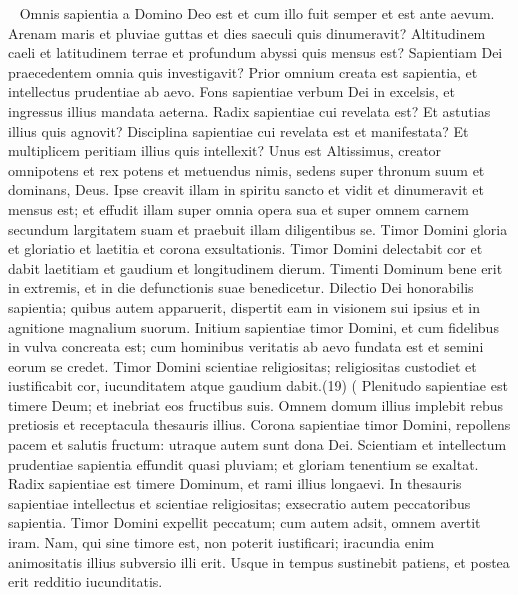 
\begin{biblechapter}   
\verse Omnis sapientia a Domino Deo est et cum illo fuit semper et est ante aevum. 
\verse Arenam maris et pluviae guttas et dies saeculi quis dinumeravit? Altitudinem caeli et latitudinem terrae et profundum abyssi quis mensus est? 
\verse Sapientiam Dei praecedentem omnia quis investigavit? 
\verse Prior omnium creata est sapientia, et intellectus prudentiae ab aevo. 
\verse Fons sapientiae verbum Dei in excelsis, et ingressus illius mandata aeterna. 
\verse Radix sapientiae cui revelata est? Et astutias illius quis agnovit? 
\verse Disciplina sapientiae cui revelata est et manifestata? Et multiplicem peritiam illius quis intellexit? 
\verse Unus est Altissimus, creator omnipotens et rex potens et metuendus nimis, sedens super thronum suum et dominans, Deus. 
\verse Ipse creavit illam in spiritu sancto et vidit et dinumeravit et mensus est; 
\verse et effudit illam super omnia opera sua et super omnem carnem secundum largitatem suam et praebuit illam diligentibus se. 
\verse Timor Domini gloria et gloriatio et laetitia et corona exsultationis. 
\verse Timor Domini delectabit cor et dabit laetitiam et gaudium et longitudinem dierum. 
\verse Timenti Dominum bene erit in extremis, et in die defunctionis suae benedicetur. 
\verse Dilectio Dei honorabilis sapientia; 
\verse quibus autem apparuerit, dispertit eam in visionem sui ipsius et in agnitione magnalium suorum. 
\verse Initium sapientiae timor Domini, et cum fidelibus in vulva concreata est; cum hominibus veritatis ab aevo fundata est et semini eorum se credet. 
\verse Timor Domini scientiae religiositas; 
\verse religiositas custodiet et iustificabit cor, iucunditatem atque gaudium dabit.(19) (
\verse Plenitudo sapientiae est timere Deum; et inebriat eos fructibus suis. 
\verse Omnem domum illius implebit rebus pretiosis et receptacula thesauris illius. 
\verse Corona sapientiae timor Domini, repollens pacem et salutis fructum: 
\verse utraque autem sunt dona Dei. 
\verse Scientiam et intellectum prudentiae sapientia effundit quasi pluviam; et gloriam tenentium se exaltat. 
\verse Radix sapientiae est timere Dominum, et rami illius longaevi. 
\verse In thesauris sapientiae intellectus et scientiae religiositas; exsecratio autem peccatoribus sapientia. 
\verse Timor Domini expellit peccatum; cum autem adsit, omnem avertit iram. 
\verse Nam, qui sine timore est, non poterit iustificari; iracundia enim animositatis illius subversio illi erit. 
\verse Usque in tempus sustinebit patiens, et postea erit redditio iucunditatis. 

\end{biblechapter}
